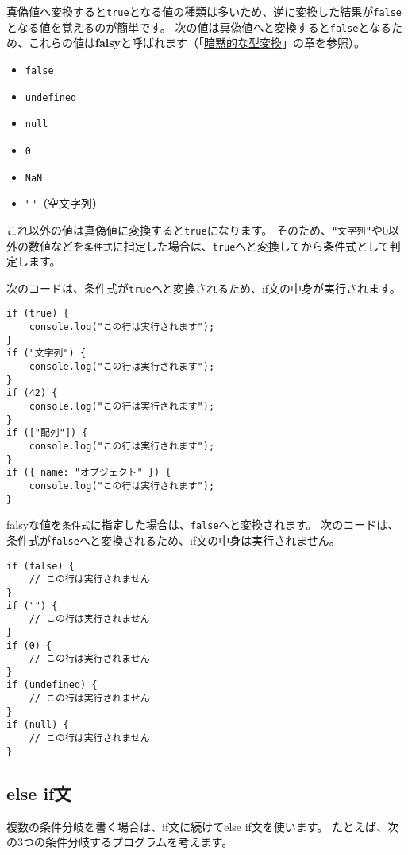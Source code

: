真偽値へ変換すると\texttt{true}となる値の種類は多いため、逆に変換した結果が\texttt{false}となる値を覚えるのが簡単です。
次の値は真偽値へと変換すると\texttt{false}となるため、これらの値は\textbf{falsy}と呼ばれます（「\hyperlink{implicit-coercion}{暗黙的な型変換}」の章を参照）。

\begin{itemize}
\item
  \texttt{false}
\item
  \texttt{undefined}
\item
  \texttt{null}
\item
  \texttt{0}
\item
  \texttt{NaN}
\item
  \texttt{""}（空文字列）
\end{itemize}

これ以外の値は真偽値に変換すると\texttt{true}になります。
そのため、\texttt{"文字列"}や0以外の数値などを\texttt{条件式}に指定した場合は、\texttt{true}へと変換してから条件式として判定します。

次のコードは、条件式が\texttt{true}へと変換されるため、if文の中身が実行されます。

\begin{lstlisting}
if (true) {
    console.log("この行は実行されます"); 
}
if ("文字列") {
    console.log("この行は実行されます");
}
if (42) {
    console.log("この行は実行されます");
}
if (["配列"]) {
    console.log("この行は実行されます");
}
if ({ name: "オブジェクト" }) {
    console.log("この行は実行されます");
}
\end{lstlisting}

falsyな値を\texttt{条件式}に指定した場合は、\texttt{false}へと変換されます。
次のコードは、条件式が\texttt{false}へと変換されるため、if文の中身は実行されません。

\begin{lstlisting}
if (false) {
    // この行は実行されません
}
if ("") {
    // この行は実行されません
}
if (0) {
    // この行は実行されません
}
if (undefined) {
    // この行は実行されません
}
if (null) {
    // この行は実行されません
}
\end{lstlisting}

\hypertarget{else-if-statement}{%
\subsection{else if文}\label{else-if-statement}}

複数の条件分岐を書く場合は、if文に続けてelse if文を使います。
たとえば、次の3つの条件分岐するプログラムを考えます。

